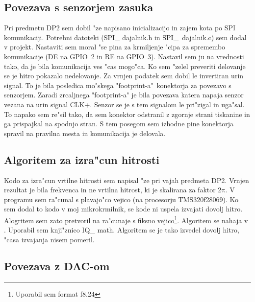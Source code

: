 \documentclass[a4paper]{article}
\begin{document}
\subsection{Povezava s senzorjem zasuka}

Pri predmetu DP2 sem dobil "ze napisano inicializacijo in zajem kota po SPI komunikaciji. Potrebni datoteki (SPI\_ dajalnik.h in \mbox{SPI\_ dajalnik.c}) sem dodal v projekt. Nastaviti sem moral "se pina za krmiljenje "cipa za spremembo komunikacije (DE na GPIO~2 in RE na GPIO~3). Nastavil sem ju na vrednosti tako, da je bila komunikacija ves "cas mogo"ca. Ko sem "zelel preveriti delovanje se je hitro pokazalo nedelovanje. Za vrnjen podatek sem dobil le invertiran urin signal. To je bila posledica mo"skega "\mbox{footprint-a}"~konektorja za povezavo s senzorjem. Zaradi zrcaljnega "footprint-a" je bila povezava katera napaja senzor vezana na urin signal CLK+. Senzor se je s tem signalom le pri"zigal in uga"sal. To napako sem re"sil tako, da sem konektor odstranil z zgornje strani tiskanine in ga prispajkal na spodnjo stran. S tem posegom sem izhodne pine konektorja spravil na pravilna mesta in komunikacija je delovala.

\subsection{Algoritem za izra"cun hitrosti}  

Kodo za izra"cun vrtilne hitrosti sem napisal "ze pri vajah predmeta DP2. Vrnjen rezultat je bila frekvenca in ne vrtilna hitrost, ki je skalirana za faktor 2$\mathrm{\pi}$. V programu sem ra"cunal s plavajo"co vejico (na procesorju TMS320f28069). Ko sem dodal to kodo v moj mikrokrmilnik, se  kode ni uspela izvajati dovolj hitro. Alogritem sem zato pretvoril na ra"cunaje s fiksno vejico\footnote{Uporabil sem format f8.24}. Algoritem se nahaja v . Uporabil sem knji"znico IQ\_ math. Algoritem  se je tako izvedel dovolj hitro, "casa izvajanja nisem pomeril.


\subsection{Povezava z DAC-om}
\end{document}
